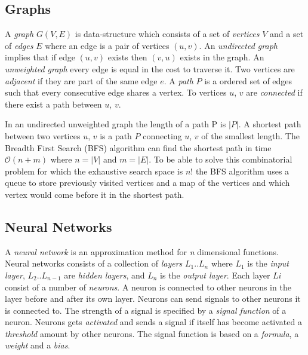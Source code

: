 \documentclass{article}
\newcommand{\newpar}{\bigskip\noindent}
\begin{document}
\subsection{Graphs}
A \textit{graph} $G(V,E)$ is data-structure which consists of a set of \textit{vertices} $V$ and a set of \textit{edges} $E$ where an edge is a pair of vertices $(u,v)$. An \textit{undirected graph} implies that if edge $ (u,v) $ exists then $ (v,u) $ exists in the graph. An \textit{unweighted graph} every edge is equal in the cost to traverse it.
Two vertices are \textit{adjacent} if they are part of the same edge $ e $. A \textit{path} $ P $ is a ordered set of edges such that every consecutive edge shares a vertex. To vertices $ u $, $ v $ are \textit{connected} if there exist a path between $ u $, $ v $.

\newpar In an undirected unweighted graph the length of a path P is $ |P| $. A shortest path between two vertices  $ u $, $ v $ is a path $ P $ connecting  $ u $, $ v $ of the smallest length. The Breadth First Search (BFS) algorithm can find the shortest path in time $ \mathcal{O}(n+m) $ where $ n=|V| $ and $ m=|E| $. To be able to solve this combinatorial problem for which the exhaustive search space is $ n! $ the BFS algorithm uses a queue to store previously visited vertices and a map of the vertices and which vertex would come before it in the shortest path.


\subsection{Neural Networks}
A \textit{neural network} is an approximation method for \textit{n} dimensional functions. Neural networks consists of a collection of \textit{layers} $L_1 .. L_n$ where $L_1$ is the \textit{input layer}, $L_2 .. L_{n-1}$ are \textit{hidden layers}, and $L_n$ is the \textit{output layer}. Each layer $ Li $ consist of a number of \textit{neurons}. A neuron is connected to other neurons in the layer before and after its own layer. Neurons can send signals to other neurons it is connected to. The strength of a signal is specified by a \textit{signal function} of a neuron. Neurons gets \textit{activated} and sends a signal if itself has become activated a \textit{threshold} amount by other neurons. The signal function is based on a \textit{formula}, a \textit{weight} and a \textit{bias}. 
\end{document}
